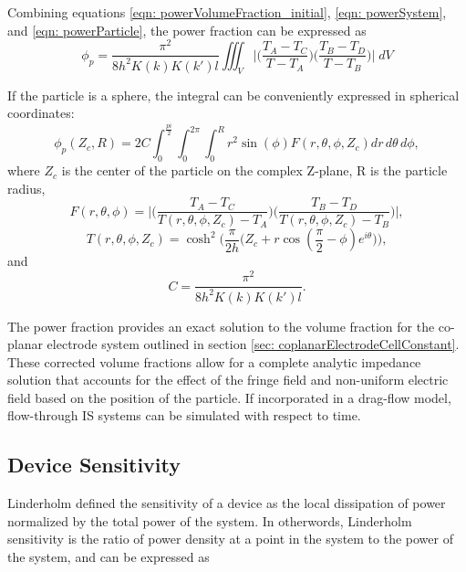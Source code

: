 Combining equations \ref{eqn: powerVolumeFraction_initial}, \ref{eqn: powerSystem}, and \ref{eqn: powerParticle}, the power fraction can be expressed as
\begin{equation}
    \phi_p = \frac{\pi^2 }{8h^2K(k)K(k')l}\iiint_V \bigg|\bigg(\frac{T_A-T_C}{T-T_A}\bigg)\bigg(\frac{T_B-T_D}{T-T_B}\bigg)\bigg| \;dV
    \label{eqn:power_fraction}
\end{equation}

\par If the particle is a sphere, the integral can be conveniently expressed in spherical coordinates:
\begin{equation}
    \phi_p(Z_c,R) = 2C\int_{0}^\frac{pi}{2}\int_0^{2\pi}\int_0^R r^2 \sin(\phi)F(r,\theta,\phi,Z_c)dr\,d\theta\,d\phi,
\end{equation}
\noindent where $Z_c$ is the center of the particle on the complex Z-plane, R is the particle radius,
\begin{equation}
    F(r,\theta,\phi) = \bigg|\bigg(\frac{T_A-T_C}{T(r,\theta,\phi,Z_c)-T_A}\bigg)\bigg(\frac{T_B-T_D}{T(r,\theta,\phi,Z_c)-T_B}\bigg)\bigg|,
\end{equation}
\begin{equation}
    T(r,\theta,\phi,Z_c) = \cosh^2\bigg(\frac{\pi}{2h}\Big(Z_c+r\cos(\frac{\pi}{2}-\phi)e^{i\theta}\Big)\bigg),
\end{equation}
\noindent and
\begin{equation}
    C = \frac{\pi^2}{8h^2K(k)K(k')l}.
\end{equation}

\par The power fraction provides an exact solution to the volume fraction for the co-planar electrode system outlined in section \ref{sec: coplanarElectrodeCellConstant}. These corrected volume fractions allow for a complete analytic impedance solution that accounts for the effect of the fringe field and non-uniform electric field based on the position of the particle. If incorporated in a drag-flow model, flow-through IS systems can be simulated with respect to time.


\subsection{Device Sensitivity}
\par Linderholm defined the sensitivity of a device as the local dissipation of power normalized by the total power of the system. In otherwords, Linderholm sensitivity is the ratio of power density at a point in the system to the power of the system, and can be expressed as

